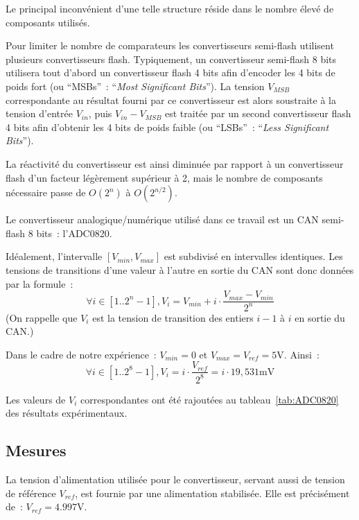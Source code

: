 \documentclass{article}
\begin{document}
Le principal inconvénient d'une telle structure réside dans le nombre élevé de composants utilisés. 

Pour limiter le nombre de comparateurs les convertisseurs semi-flash utilisent plusieurs convertisseurs flash. Typiquement, un convertisseur semi-flash 8 bits utilisera tout d'abord un convertisseur flash 4 bits afin d'encoder les 4 bits de poids fort (ou ``MSBs''~: ``\textit{Most Significant Bits}''). La tension $V_{MSB}$ correspondante au résultat fourni par ce convertisseur est alors soustraite à la tension d'entrée $V_{in}$, puis $V_{in}-V_{MSB}$ est traitée par un second convertisseur flash 4 bits afin d'obtenir les 4 bits de poids faible (ou ``LSBs''~: ``\textit{Less Significant Bits}'').

La réactivité du convertisseur est ainsi diminuée par rapport à un convertisseur flash d'un facteur légèrement supérieur à 2, mais le nombre de composants nécessaire passe de $O(2^n)$ à $O(2^{n/2})$.

Le convertisseur analogique/numérique utilisé dans ce travail est un CAN semi-flash 8 bits~: l'ADC0820.



Idéalement, l'intervalle $[V_{min},V_{max}]$ est subdivisé en intervalles identiques. Les tensions de transitions d'une valeur à l'autre en sortie du CAN sont donc données par la formule~:
\begin{equation*}
\forall i\in[1..2^n-1], V_i = V_{min}+i\cdot\frac{V_{max}-V_{min}}{2^n}
\end{equation*}
(On rappelle que $V_i$ est la tension de transition des entiers $i-1$ à $i$ en sortie du CAN.)

Dans le cadre de notre expérience~: $V_{min}=0$ et $V_{max}=V_{ref}=\mathrm{5 V}$. Ainsi~:
\begin{equation*}
\forall i\in[1..2^8-1], V_i = i\cdot\frac{V_{ref}}{2^8} = i\cdot \mathrm{19,531 mV}
\end{equation*}

Les valeurs de $V_i$ correspondantes ont été rajoutées au tableau~\ref{tab:ADC0820} des résultats expérimentaux.


\subsection{Mesures}


La tension d'alimentation utilisée pour le convertisseur, servant aussi de tension de référence $V_{ref}$, est fournie par une alimentation stabilisée. Elle est précisément de~: ${V_{ref}=\mathrm{4.997 V}}$.
\end{document}

